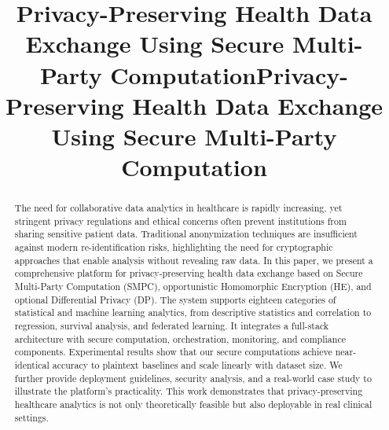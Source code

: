 \documentclass[conference]{IEEEtran}
\begin{document}
\title{Privacy-Preserving Health Data Exchange Using Secure Multi-Party Computation}

\title{Privacy-Preserving Health Data Exchange Using Secure Multi-Party Computation}

\author{
\and
{}
\and
{}
}

\maketitle

\begin{abstract}
The need for collaborative data analytics in healthcare is rapidly increasing, yet stringent privacy regulations and ethical concerns often prevent institutions from sharing sensitive patient data. Traditional anonymization techniques are insufficient against modern re-identification risks, highlighting the need for cryptographic approaches that enable analysis without revealing raw data. In this paper, we present a comprehensive platform for privacy-preserving health data exchange based on Secure Multi-Party Computation (SMPC), opportunistic Homomorphic Encryption (HE), and optional Differential Privacy (DP). The system supports eighteen categories of statistical and machine learning analytics, from descriptive statistics and correlation to regression, survival analysis, and federated learning. It integrates a full-stack architecture with secure computation, orchestration, monitoring, and compliance components. Experimental results show that our secure computations achieve near-identical accuracy to plaintext baselines and scale linearly with dataset size. We further provide deployment guidelines, security analysis, and a real-world case study to illustrate the platform's practicality. This work demonstrates that privacy-preserving healthcare analytics is not only theoretically feasible but also deployable in real clinical settings.
\end{abstract}
\end{document}
